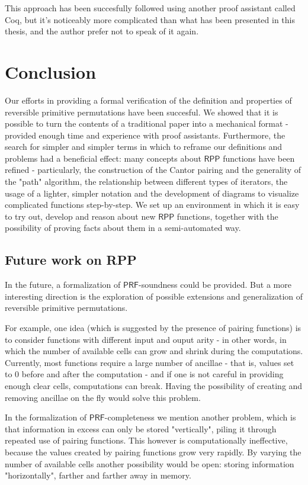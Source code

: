 \documentclass{book}
\theoremstyle{definition}
\theoremstyle{remark}
\theoremstyle{plain}
\newcommand{\RPP}{\mathsf{RPP}}
\newcommand{\PRF}{\mathsf{PRF}}
\begin{document}
This approach has been succesfully followed using another proof assistant called Coq,
but it's noticeably more complicated than what has been presented in this thesis,
and the author prefer not to speak of it again.

\chapter{Conclusion}

Our efforts in providing a formal verification of the definition and properties of reversible primitive permutations have been succesful.
We showed that it is possible to turn the contents of a traditional paper into a mechanical format -
provided enough time and experience with proof assistants.
Furthermore, the search for simpler and simpler terms in which to reframe our definitions and problems
had a beneficial effect: many concepts about $\RPP$ functions have been refined -
particularly, the construction of the Cantor pairing and the generality of the "path" algorithm,
the relationship between different types of iterators,
the usage of a lighter, simpler notation and the development of diagrams to visualize complicated functions step-by-step.
We set up an environment in which it is easy to try out, develop and reason about new $\RPP$ functions,
together with the possibility of proving facts about them in a semi-automated way.

\section{Future work on RPP}

In the future, a formalization of $\PRF$-soundness could be provided.
But a more interesting direction is the exploration of possible extensions and generalization of reversible primitive permutations.

For example, one idea (which is suggested by the presence of pairing functions) is to consider functions with
different input and ouput arity - in other words, in which the number of available cells can grow and shrink during the computations.
Currently, most functions require a large number of ancillae - that is, values set to $0$ before and after the computation -
and if one is not careful in providing enough clear cells, computations can break.
Having the possibility of creating and removing ancillae on the fly would solve this problem.

In the formalization of $\PRF$-completeness we mention another problem,
which is that information in excess can only be stored "vertically", piling it through repeated use of pairing functions.
This however is computationally ineffective, because the values created by pairing functions grow very rapidly.
By varying the number of available cells another possibility would be open: storing information "horizontally",
farther and farther away in memory.
\end{document}

